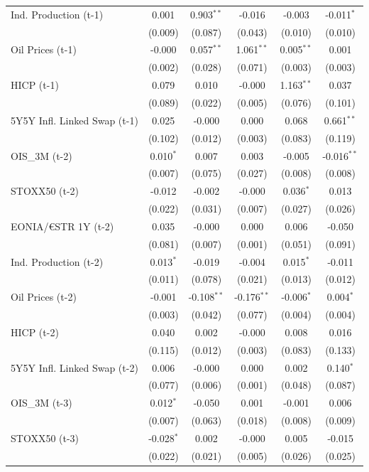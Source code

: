 \begin{longtable}[t]{lccccc}
Ind. Production (t-1) & 0.001 & 0.903$^{**}$ & -0.016 & -0.003 & -0.011$^{*}$\\
 & (0.009) & (0.087) & (0.043) & (0.010) & (0.010)\\
Oil Prices (t-1) & -0.000 & 0.057$^{**}$ & 1.061$^{**}$ & 0.005$^{**}$ & 0.001\\
 & (0.002) & (0.028) & (0.071) & (0.003) & (0.003)\\
HICP (t-1) & 0.079 & 0.010 & -0.000 & 1.163$^{**}$ & 0.037\\
 & (0.089) & (0.022) & (0.005) & (0.076) & (0.101)\\
5Y5Y Infl. Linked Swap (t-1) & 0.025 & -0.000 & 0.000 & 0.068 & 0.661$^{**}$\\
 & (0.102) & (0.012) & (0.003) & (0.083) & (0.119)\\
OIS\_3M (t-2) & 0.010$^{*}$ & 0.007 & 0.003 & -0.005 & -0.016$^{**}$\\
 & (0.007) & (0.075) & (0.027) & (0.008) & (0.008)\\
STOXX50 (t-2) & -0.012 & -0.002 & -0.000 & 0.036$^{*}$ & 0.013\\
 & (0.022) & (0.031) & (0.007) & (0.027) & (0.026)\\
EONIA/€STR 1Y (t-2) & 0.035 & -0.000 & 0.000 & 0.006 & -0.050\\
 & (0.081) & (0.007) & (0.001) & (0.051) & (0.091)\\
Ind. Production (t-2) & 0.013$^{*}$ & -0.019 & -0.004 & 0.015$^{*}$ & -0.011\\
 & (0.011) & (0.078) & (0.021) & (0.013) & (0.012)\\
Oil Prices (t-2) & -0.001 & -0.108$^{**}$ & -0.176$^{**}$ & -0.006$^{*}$ & 0.004$^{*}$\\
 & (0.003) & (0.042) & (0.077) & (0.004) & (0.004)\\
HICP (t-2) & 0.040 & 0.002 & -0.000 & 0.008 & 0.016\\
 & (0.115) & (0.012) & (0.003) & (0.083) & (0.133)\\
5Y5Y Infl. Linked Swap (t-2) & 0.006 & -0.000 & 0.000 & 0.002 & 0.140$^{*}$\\
 & (0.077) & (0.006) & (0.001) & (0.048) & (0.087)\\
OIS\_3M (t-3) & 0.012$^{*}$ & -0.050 & 0.001 & -0.001 & 0.006\\
 & (0.007) & (0.063) & (0.018) & (0.008) & (0.009)\\
STOXX50 (t-3) & -0.028$^{*}$ & 0.002 & -0.000 & 0.005 & -0.015\\
 & (0.022) & (0.021) & (0.005) & (0.026) & (0.025)\\

\end{longtable}
